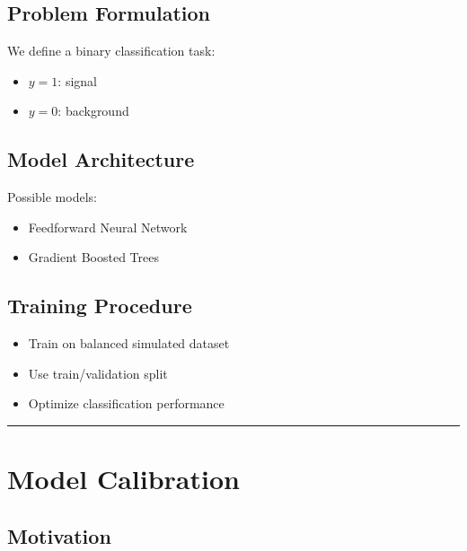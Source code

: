\documentclass[
  authoryear,
  preprint]{elsarticle}
\providecommand{\tightlist}{%
  \setlength{\itemsep}{0pt}\setlength{\parskip}{0pt}}
\begin{document}
\subsection{Problem Formulation}\label{problem-formulation}

We define a binary classification task:

\begin{itemize}
\tightlist
\item
  \(y = 1\): signal
\item
  \(y = 0\): background
\end{itemize}

\subsection{Model Architecture}\label{model-architecture}

Possible models:

\begin{itemize}
\tightlist
\item
  Feedforward Neural Network
\item
  Gradient Boosted Trees
\end{itemize}

\subsection{Training Procedure}\label{training-procedure}

\begin{itemize}
\tightlist
\item
  Train on balanced simulated dataset
\item
  Use train/validation split
\item
  Optimize classification performance
\end{itemize}

\begin{center}\rule{0.5\linewidth}{0.5pt}\end{center}

\section{Model Calibration}\label{model-calibration}

\subsection{Motivation}\label{motivation}
\end{document}
